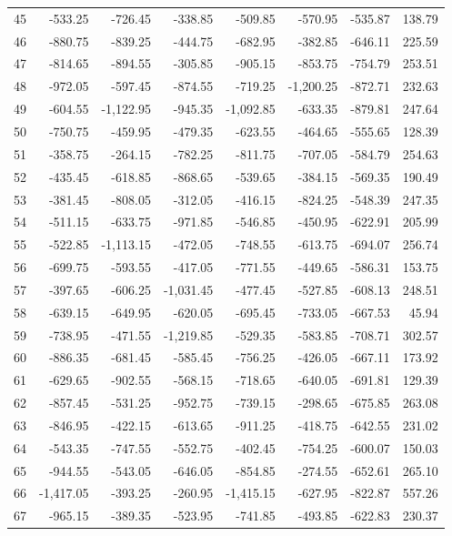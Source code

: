 \begin{longtable}{rrrrrrrr}
45 & -533.25 & -726.45 & -338.85 & -509.85 & -570.95 & -535.87 & 138.79  \\
46 & -880.75 & -839.25 & -444.75 & -682.95 & -382.85 & -646.11 & 225.59  \\
47 & -814.65 & -894.55 & -305.85 & -905.15 & -853.75 & -754.79 & 253.51  \\
48 & -972.05 & -597.45 & -874.55 & -719.25 & -1,200.25 & -872.71 & 232.63  \\
49 & -604.55 & -1,122.95 & -945.35 & -1,092.85 & -633.35 & -879.81 & 247.64  \\
50 & -750.75 & -459.95 & -479.35 & -623.55 & -464.65 & -555.65 & 128.39  \\
51 & -358.75 & -264.15 & -782.25 & -811.75 & -707.05 & -584.79 & 254.63  \\
52 & -435.45 & -618.85 & -868.65 & -539.65 & -384.15 & -569.35 & 190.49  \\
53 & -381.45 & -808.05 & -312.05 & -416.15 & -824.25 & -548.39 & 247.35  \\
54 & -511.15 & -633.75 & -971.85 & -546.85 & -450.95 & -622.91 & 205.99  \\
55 & -522.85 & -1,113.15 & -472.05 & -748.55 & -613.75 & -694.07 & 256.74  \\
56 & -699.75 & -593.55 & -417.05 & -771.55 & -449.65 & -586.31 & 153.75  \\
57 & -397.65 & -606.25 & -1,031.45 & -477.45 & -527.85 & -608.13 & 248.51  \\
58 & -639.15 & -649.95 & -620.05 & -695.45 & -733.05 & -667.53 & 45.94  \\
59 & -738.95 & -471.55 & -1,219.85 & -529.35 & -583.85 & -708.71 & 302.57  \\
60 & -886.35 & -681.45 & -585.45 & -756.25 & -426.05 & -667.11 & 173.92  \\
61 & -629.65 & -902.55 & -568.15 & -718.65 & -640.05 & -691.81 & 129.39  \\
62 & -857.45 & -531.25 & -952.75 & -739.15 & -298.65 & -675.85 & 263.08  \\
63 & -846.95 & -422.15 & -613.65 & -911.25 & -418.75 & -642.55 & 231.02  \\
64 & -543.35 & -747.55 & -552.75 & -402.45 & -754.25 & -600.07 & 150.03  \\
65 & -944.55 & -543.05 & -646.05 & -854.85 & -274.55 & -652.61 & 265.10  \\
66 & -1,417.05 & -393.25 & -260.95 & -1,415.15 & -627.95 & -822.87 & 557.26  \\
67 & -965.15 & -389.35 & -523.95 & -741.85 & -493.85 & -622.83 & 230.37  \\

\end{longtable}
